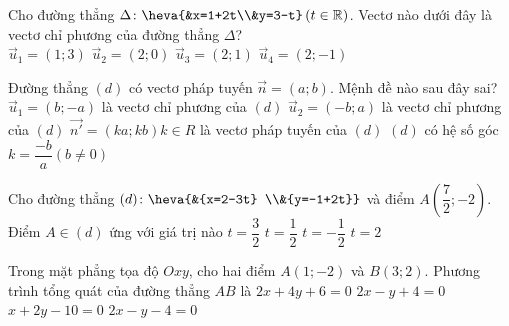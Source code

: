 \begin{ex}%
	Cho đường thẳng $\Delta\colon \heva{&x=1+2t\\&y=3-t}\,(t\in \mathbb{R})$. Vectơ nào dưới đây là vectơ chỉ phương của đường  thẳng $\Delta$?\\
	\choice 
		{$\overrightarrow{u}_{1}=(1;3)$} 
		 {$\overrightarrow{u}_{2}=(2;0)$}
		{$\overrightarrow{u}_{3}=(2;1)$} 
		 {\True $\overrightarrow{u}_{4}=(2;-1)$}
\end{ex}

\begin{ex}%
	Đường thẳng  $(d)$ có vectơ pháp tuyến $\overrightarrow{n}=\left(a;b\right)$. Mệnh đề nào sau đây sai?
	\choice 
		{$\overrightarrow{u}_1=\left(b;-a\right)$ là vectơ chỉ phương của $(d)$} 
		{$\overrightarrow{u}_2=\left(-b;a\right)$ là vectơ  chỉ phương của $(d)$}
		{$\overrightarrow{n'}=\left(ka;kb\right) k\in R$ là  vectơ pháp tuyến của $(d)$}
		{\True $(d)$ có  hệ số góc $k=\dfrac{-b}{a} \left(b\ne 0\right)$}
\end{ex}

\begin{ex}%
	Cho đường thẳng $(d)\colon \heva{&{x=2-3t} \\&{y=-1+2t}}$ và  điểm $A\left(\dfrac{7}{2};-2\right)$. Điểm $A\in (d)$ ứng với giá trị nào
	 \choice
		 {$t=\dfrac{3}{2}$}
		 {$t=\dfrac{1}{2}$}
		 {\True $t=-\dfrac{1}{2}$}
		 {$t=2$}
\end{ex}

\begin{ex}%
	Trong mặt phẳng tọa độ $Oxy$, cho hai điểm $A(1;-2)$ và $B(3; 2)$. Phương trình tổng quát của đường thẳng  $AB$ là
	 \choice
		{$2x+4y+6=0$} 
		{$2x-y+4=0$} 
		{$x+2y-10=0$} 
		 {\True $2x-y-4=0$}
\end{ex}

